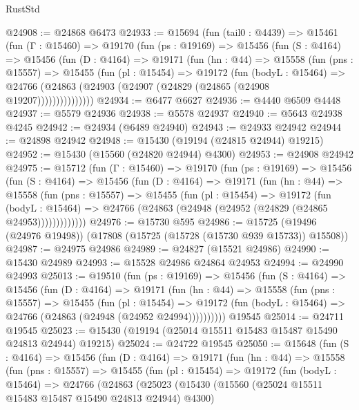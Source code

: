 \begin{lexlean}{RustStd}
\begin{coremodule}
@24908 := @24868 @6473
@24933 := @15694
    (fun (tail0 : @4439) =>
    @15461
      (fun (Γ : @15460) =>
      @19170
        (fun (ps : @19169) =>
        @15456
          (fun (S : @4164) =>
          @15456
            (fun (D : @4164) =>
            @19171
              (fun (hn : @44) =>
              @15558
                (fun (pns : @15557) =>
                @15455
                  (fun (pl : @15454) =>
                  @19172
                    (fun (bodyL : @15464) =>
                    @24766 (@24863 (@24903 (@24907 (@24829 (@24865 (@24908 @19207)))))))))))))))
@24934 := @6477 @6627
@24936 := @4440 @6509 @4448
@24937 := @5579 @24936
@24938 := @5578 @24937
@24940 := @5643 @24938 @4245
@24942 := @24934 (@6489 @24940)
@24943 := @24933 @24942
@24944 := @24898 @24942
@24948 := @15430 (@19194 (@24815 @24944) @19215)
@24952 := @15430 (@15560 (@24820 @24944) @4300)
@24953 := @24908 @24942
@24975 := @15712
    (fun (Γ : @15460) =>
    @19170
      (fun (ps : @19169) =>
      @15456
        (fun (S : @4164) =>
        @15456
          (fun (D : @4164) =>
          @19171
            (fun (hn : @44) =>
            @15558
              (fun (pns : @15557) =>
              @15455
                (fun (pl : @15454) =>
                @19172
                  (fun (bodyL : @15464) =>
                  @24766 (@24863 (@24948 (@24952 (@24829 (@24865 @24953)))))))))))))
@24976 := @15730 @595
@24986 := @15725 (@19496 (@24976 @19498)) (@17808 (@15725 (@15728 (@15730 @939 @15733)) @15508))
@24987 := @24975 @24986
@24989 := @24827 (@15521 @24986)
@24990 := @15430 @24989
@24993 := @15528 @24986 @24864 @24953
@24994 := @24990 @24993
@25013 := @19510
    (fun (ps : @19169) =>
    @15456
      (fun (S : @4164) =>
      @15456
        (fun (D : @4164) =>
        @19171
          (fun (hn : @44) =>
          @15558
            (fun (pns : @15557) =>
            @15455
              (fun (pl : @15454) =>
              @19172 (fun (bodyL : @15464) => @24766 (@24863 (@24948 (@24952 @24994))))))))))
    @19545
@25014 := @24711 @19545
@25023 := @15430 (@19194 (@25014 @15511 @15483 @15487 @15490 @24813 @24944) @19215)
@25024 := @24722 @19545
@25050 := @15648
    (fun (S : @4164) =>
    @15456
      (fun (D : @4164) =>
      @19171
        (fun (hn : @44) =>
        @15558
          (fun (pns : @15557) =>
          @15455
            (fun (pl : @15454) =>
            @19172
              (fun (bodyL : @15464) =>
              @24766
                (@24863
                  (@25023
                    (@15430
                      (@15560 (@25024 @15511 @15483 @15487 @15490 @24813 @24944) @4300)

\end{coremodule}
\end{lexlean}

